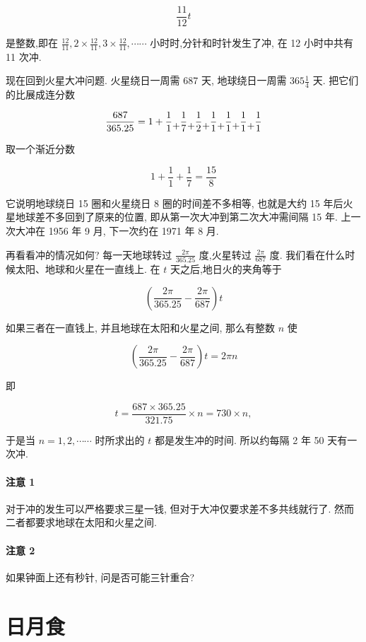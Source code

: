 \documentclass{ctexart}
\newcommand{\cplus}{\raisebox{-1ex}{+}}
\begin{document}
\[
\frac{11}{12}t
\]

是整数,即在 \(\frac{12}{11},2 \times \frac{12}{11},3 \times \frac{12}{11},\cdots \cdots\) 小时时,分针和时针发生了冲, 在 12 小时中共有 11 次冲.

现在回到火星大冲问题. 火星绕日一周需 687 天, 地球绕日一周需 \({365}\frac{1}{4}\) 天. 把它们的比展成连分数

\[
\frac{687}{365.25} = 1 + \frac{1}{1} \cplus \frac{1}{7} \cplus \frac{1}{2} \cplus \frac{1}{1} \cplus \frac{1}{1} \cplus \frac{1}{1} \cplus \frac{1}{1}
\]

取一个渐近分数

\[
1 + \frac{1}{1} + \frac{1}{7} = \frac{15}{8}
\]

它说明地球绕日 15 圈和火星绕日 8 圈的时间差不多相等, 也就是大约 15 年后火星地球差不多回到了原来的位置, 即从第一次大冲到第二次大冲需间隔 15 年. 上一次大冲在 1956 年 9 月, 下一次约在 1971 年 8 月.

再看看冲的情况如何? 每一天地球转过 \(\frac{2\pi}{365.25}\) 度,火星转过 \(\frac{2\pi}{687}\) 度. 我们看在什么时候太阳、地球和火星在一直线上. 在 \(t\) 天之后,地日火的夹角等于

\[
\left( {\frac{2\pi}{365.25} - \frac{2\pi}{687}}\right) t
\]

如果三者在一直钱上, 并且地球在太阳和火星之间, 那么有整数 \(n\) 使

\[
\left( {\frac{2\pi }{365.25} - \frac{2\pi }{687}}\right) t = {2\pi n}
\]

即

\[
t = \frac{{687} \times {365.25}}{321.75} \times n = {730} \times n,
\]

于是当 \(n = 1,2,\cdots \cdots\) 时所求出的 \(t\) 都是发生冲的时间. 所以约每隔 2 年 50 天有一次冲.

\paragraph*{注意 1}
对于冲的发生可以严格要求三星一钱, 但对于大冲仅要求差不多共线就行了. 然而二者都要求地球在太阳和火星之间.

\paragraph*{注意 2}
如果钟面上还有秒针, 问是否可能三针重合?

\section{日月食}
\end{document}
